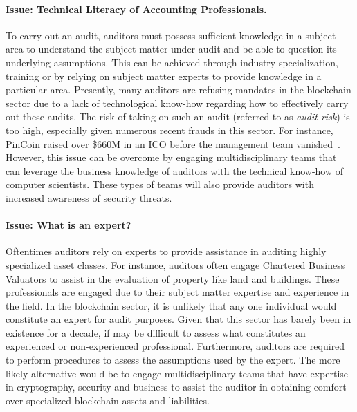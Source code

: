 \paragraph{Issue: Technical Literacy of Accounting Professionals.} To carry out an audit, auditors must possess sufficient knowledge in a subject area to understand the subject matter under audit and be able to question its underlying assumptions. This can be achieved through industry specialization, training or by relying on subject matter experts to provide knowledge in a particular area. Presently, many auditors are refusing mandates in the blockchain sector due to a lack of technological know-how regarding how to effectively carry out these audits. The risk of taking on such an audit (referred to as \textit{audit risk}) is too high, especially given numerous recent frauds in this sector. For instance, PinCoin raised over \$660M in an ICO before the management team vanished~\cite{techcrunchscammers}. However, this issue can be overcome by engaging multidisciplinary teams that can leverage the business knowledge of auditors with the technical know-how of computer scientists. These types of teams will also provide auditors with increased awareness of security threats.

\paragraph{Issue: What is an expert?} Oftentimes auditors rely on experts to provide assistance in auditing highly specialized asset classes. For instance, auditors often engage Chartered Business Valuators to assist in the evaluation of property like land and buildings. These professionals are engaged due to their subject matter expertise and experience in the field. In the blockchain sector, it is unlikely that any one individual would constitute an expert for audit purposes. Given that this sector has barely been in existence for a decade, if may be difficult to assess what constitutes an experienced or non-experienced professional. Furthermore, auditors are required to perform procedures to assess the assumptions used by the expert. The more likely alternative would be to engage multidisciplinary teams that have expertise in cryptography, security and business to assist the auditor in obtaining comfort over specialized blockchain assets and liabilities. 

